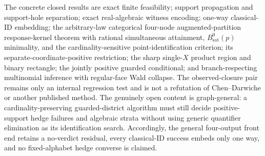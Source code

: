 \documentclass{article}
\begin{document}
The concrete closed results are exact finite feasibility; support propagation and support-hole separation; exact real-algebraic witness encoding; one-way classical-ID embedding; the arbitrary-law categorical four-node augmented-partition response-kernel theorem with rational simultaneous attainment, \(B_{\mathrm{sat}}^{0}(p)\) minimality, and the cardinality-sensitive point-identification criterion; its separate-coordinate-positive restriction; the sharp single-\(X\) product region and binary rectangle; the jointly positive guarded conditional; and branch-respecting multinomial inference with regular-face Wald collapse.  The observed-closure pair remains only an internal regression test and is not a refutation of Chen--Darwiche or another published method.  The genuinely open content is graph-general: a cardinality-preserving guarded-district algorithm must still decide positive-support hedge failures and algebraic strata without using generic quantifier elimination as its identification search.  Accordingly, the general four-output front end retains a no-verdict residual, every classical-ID success embeds only one way, and no fixed-alphabet hedge converse is claimed.
\end{document}
